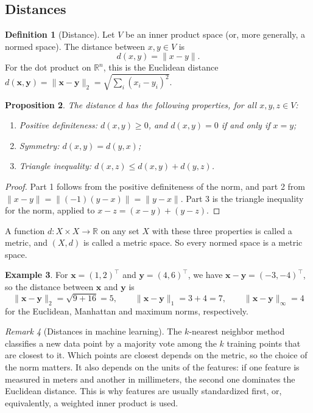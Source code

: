 \documentclass[11pt]{article}
\newcommand{\norm}[1]{\lVert #1 \rVert}
\theoremstyle{definition}
\newtheorem{definition}{Definition}[section]
\newtheorem{example}[definition]{Example}
\theoremstyle{plain}
\newtheorem{proposition}[definition]{Proposition}
\theoremstyle{remark}
\newtheorem{remark}[definition]{Remark}
\begin{document}
\subsection{Distances}

\begin{definition}[Distance]
    Let $V$ be an inner product space (or, more generally, a normed space). The distance between $x, y \in V$ is
    \[d(x, y) = \norm{x - y}.\]
    For the dot product on $\mathbb{R}^n$, this is the Euclidean distance $d(\mathbf{x}, \mathbf{y}) = \norm{\mathbf{x} - \mathbf{y}}_2 = \sqrt{\sum_i (x_i - y_i)^2}$.
\end{definition}

\begin{proposition}\label{prop:metric}
    The distance $d$ has the following properties, for all $x, y, z \in V$:
    \begin{enumerate}
        \item Positive definiteness: $d(x, y) \geq 0$, and $d(x, y) = 0$ if and only if $x = y$;
        \item Symmetry: $d(x, y) = d(y, x)$;
        \item Triangle inequality: $d(x, z) \leq d(x, y) + d(y, z)$.
    \end{enumerate}
\end{proposition}

\begin{proof}
    Part 1 follows from the positive definiteness of the norm, and part 2 from $\norm{x - y} = \norm{(-1)(y - x)} = \norm{y - x}$. Part 3 is the triangle inequality for the norm, applied to $x - z = (x - y) + (y - z)$.
\end{proof}

A function $d: X \times X \to \mathbb{R}$ on any set $X$ with these three properties is called a metric, and $(X, d)$ is called a metric space. So every normed space is a metric space.

\begin{example}
    For $\mathbf{x} = (1, 2)^\top$ and $\mathbf{y} = (4, 6)^\top$, we have $\mathbf{x} - \mathbf{y} = (-3, -4)^\top$, so the distance between $\mathbf{x}$ and $\mathbf{y}$ is
    \[\norm{\mathbf{x} - \mathbf{y}}_2 = \sqrt{9 + 16} = 5, \qquad \norm{\mathbf{x} - \mathbf{y}}_1 = 3 + 4 = 7, \qquad \norm{\mathbf{x} - \mathbf{y}}_\infty = 4\]
    for the Euclidean, Manhattan and maximum norms, respectively.
\end{example}

\begin{remark}[Distances in machine learning]
    The $k$-nearest neighbor method classifies a new data point by a majority vote among the $k$ training points that are closest to it. Which points are closest depends on the metric, so the choice of the norm matters. It also depends on the units of the features: if one feature is measured in meters and another in millimeters, the second one dominates the Euclidean distance. This is why features are usually standardized first, or, equivalently, a weighted inner product is used.
\end{remark}
\end{document}
